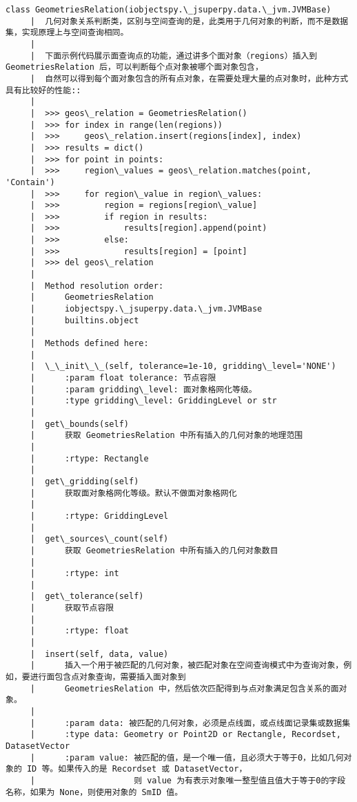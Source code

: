 \documentclass[11pt]{article}
\begin{document}
\begin{Verbatim}[commandchars=\\\{\}]
    class GeometriesRelation(iobjectspy.\_jsuperpy.data.\_jvm.JVMBase)
     |  几何对象关系判断类，区别与空间查询的是，此类用于几何对象的判断，而不是数据集，实现原理上与空间查询相同。
     |  
     |  下面示例代码展示面查询点的功能，通过讲多个面对象（regions）插入到 GeometriesRelation 后，可以判断每个点对象被哪个面对象包含，
     |  自然可以得到每个面对象包含的所有点对象，在需要处理大量的点对象时，此种方式具有比较好的性能::
     |  
     |  >>> geos\_relation = GeometriesRelation()
     |  >>> for index in range(len(regions))
     |  >>>     geos\_relation.insert(regions[index], index)
     |  >>> results = dict()
     |  >>> for point in points:
     |  >>>     region\_values = geos\_relation.matches(point, 'Contain')
     |  >>>     for region\_value in region\_values:
     |  >>>         region = regions[region\_value]
     |  >>>         if region in results:
     |  >>>             results[region].append(point)
     |  >>>         else:
     |  >>>             results[region] = [point]
     |  >>> del geos\_relation
     |  
     |  Method resolution order:
     |      GeometriesRelation
     |      iobjectspy.\_jsuperpy.data.\_jvm.JVMBase
     |      builtins.object
     |  
     |  Methods defined here:
     |  
     |  \_\_init\_\_(self, tolerance=1e-10, gridding\_level='NONE')
     |      :param float tolerance: 节点容限
     |      :param gridding\_level: 面对象格网化等级。
     |      :type gridding\_level: GriddingLevel or str
     |  
     |  get\_bounds(self)
     |      获取 GeometriesRelation 中所有插入的几何对象的地理范围
     |      
     |      :rtype: Rectangle
     |  
     |  get\_gridding(self)
     |      获取面对象格网化等级。默认不做面对象格网化
     |      
     |      :rtype: GriddingLevel
     |  
     |  get\_sources\_count(self)
     |      获取 GeometriesRelation 中所有插入的几何对象数目
     |      
     |      :rtype: int
     |  
     |  get\_tolerance(self)
     |      获取节点容限
     |      
     |      :rtype: float
     |  
     |  insert(self, data, value)
     |      插入一个用于被匹配的几何对象，被匹配对象在空间查询模式中为查询对象，例如，要进行面包含点对象查询，需要插入面对象到
     |      GeometriesRelation 中，然后依次匹配得到与点对象满足包含关系的面对象。
     |      
     |      :param data: 被匹配的几何对象，必须是点线面，或点线面记录集或数据集
     |      :type data: Geometry or Point2D or Rectangle, Recordset, DatasetVector
     |      :param value: 被匹配的值，是一个唯一值，且必须大于等于0，比如几何对象的 ID 等。如果传入的是 Recordset 或 DatasetVector，
     |                    则 value 为有表示对象唯一整型值且值大于等于0的字段名称，如果为 None，则使用对象的 SmID 值。

\end{Verbatim}
\end{document}
